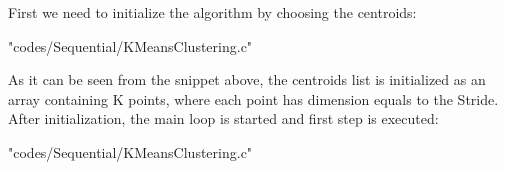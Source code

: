 \documentclass[10pt,twocolumn,letterpaper]{article}
\begin{document}
First we need to initialize the algorithm by choosing the centroids:\\

\begin{lstinputlisting}[language=C,style=CSnippetStyle,caption=Centroids Initialization,firstline=54,lastline=61 ]{
	"codes/Sequential/KMeansClustering.c"}
\end{lstinputlisting}

As it can be seen from the snippet above, the centroids list is initialized as an array containing K points, where each point has 
dimension equals to the Stride.\\

After initialization, the main loop is started and first step is executed:\\

\begin{lstinputlisting}[language=C,style=CSnippetStyle,caption=Minimum Distance Calculation,firstline=69,lastline=78 ]{
	"codes/Sequential/KMeansClustering.c"}
\end{lstinputlisting}
\end{document}
